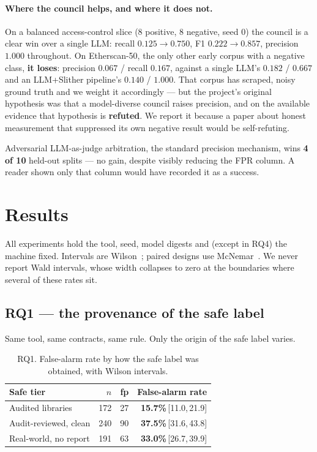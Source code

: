 \documentclass[sigconf,nonacm]{acmart}
\newcommand{\ci}[2]{\,[#1,\,#2]}
\begin{document}
\paragraph{Where the council helps, and where it does not.}
On a balanced access-control slice (8 positive, 8 negative, seed 0) the council is
a clear win over a single LLM: recall $0.125 \rightarrow 0.750$, F1
$0.222 \rightarrow 0.857$, precision $1.000$ throughout. On Etherscan-50, the
only other early corpus with a negative class, \textbf{it loses}: precision
$0.067$ / recall $0.167$, against a single LLM's $0.182$ / $0.667$ and an
LLM+Slither pipeline's $0.140$ / $1.000$. That corpus has scraped, noisy ground
truth and we weight it accordingly --- but the project's original hypothesis was
that a model-diverse council raises precision, and on the available evidence that
hypothesis is \textbf{refuted}. We report it because a paper about honest
measurement that suppressed its own negative result would be self-refuting.

Adversarial LLM-as-judge arbitration, the standard precision mechanism, wins
\textbf{4 of 10} held-out splits --- no gain, despite visibly reducing the FPR
column. A reader shown only that column would have recorded it as a success.

\section{Results}

All experiments hold the tool, seed, model digests and (except in RQ4) the
machine fixed. Intervals are Wilson~\cite{wilson}; paired designs use
McNemar~\cite{mcnemar}. We never report Wald intervals, whose width collapses to
zero at the boundaries where several of these rates sit.

\subsection{RQ1 --- the provenance of the safe label}
\label{sec:rq1}

Same tool, same contracts, same rule. Only the origin of the safe label varies.

\begin{table}[t]
\centering
\caption{RQ1. False-alarm rate by how the safe label was obtained, with Wilson
intervals.}
\label{tab:rq1}
\small
\begin{tabular}{@{}lrrr@{}}
\toprule
\textbf{Safe tier} & \textbf{$n$} & \textbf{fp} &
\textbf{False-alarm rate} \\
\midrule
Audited libraries & 172 & 27 & \textbf{15.7\%}\ci{11.0}{21.9} \\
Audit-reviewed, clean & 240 & 90 & \textbf{37.5\%}\ci{31.6}{43.8} \\
Real-world, no report & 191 & 63 & \textbf{33.0\%}\ci{26.7}{39.9} \\
\bottomrule
\end{tabular}
\end{table}
\end{document}
